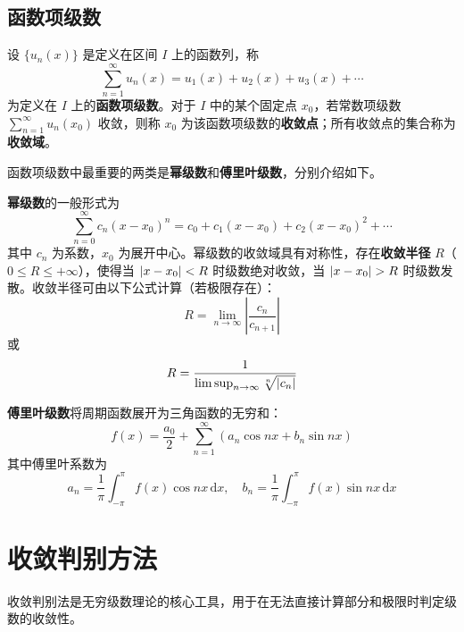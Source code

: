 \subsection{函数项级数}

\begin{definition}
设 $\{u_n(x)\}$ 是定义在区间 $I$ 上的函数列，称
\begin{equation}
\sum_{n=1}^{\infty} u_n(x) = u_1(x) + u_2(x) + u_3(x) + \cdots
\end{equation}
为定义在 $I$ 上的\textbf{函数项级数}。对于 $I$ 中的某个固定点 $x_0$，若常数项级数 $\displaystyle \sum_{n=1}^{\infty} u_n(x_0)$ 收敛，则称 $x_0$ 为该函数项级数的\textbf{收敛点}；所有收敛点的集合称为\textbf{收敛域}。
\end{definition}

函数项级数中最重要的两类是\textbf{幂级数}和\textbf{傅里叶级数}，分别介绍如下。

\textbf{幂级数}的一般形式为
\begin{equation}
\sum_{n=0}^{\infty} c_n (x - x_0)^n = c_0 + c_1(x - x_0) + c_2(x - x_0)^2 + \cdots
\end{equation}
其中 $c_n$ 为系数，$x_0$ 为展开中心。幂级数的收敛域具有对称性，存在\textbf{收敛半径} $R$（$0 \leq R \leq +\infty$），使得当 $\left|x - x_0\right| < R$ 时级数绝对收敛，当 $\left|x - x_0\right| > R$ 时级数发散。收敛半径可由以下公式计算（若极限存在）：
\begin{equation}
R = \lim_{n \to \infty} \left| \frac{c_n}{c_{n+1}} \right|
\end{equation}
或
\begin{equation}
R = \frac{1}{\limsup_{n \to \infty} \sqrt[n]{\left|c_n\right|}}
\end{equation}

\textbf{傅里叶级数}将周期函数展开为三角函数的无穷和：
\begin{equation}
f(x) = \frac{a_0}{2} + \sum_{n=1}^{\infty} \left( a_n \cos nx + b_n \sin nx \right)
\end{equation}
其中傅里叶系数为
\begin{equation}
a_n = \frac{1}{\pi} \int_{-\pi}^{\pi} f(x) \cos nx \, \mathrm{d}x, \quad b_n = \frac{1}{\pi} \int_{-\pi}^{\pi} f(x) \sin nx \, \mathrm{d}x
\end{equation}

\section{收敛判别方法}

收敛判别法是无穷级数理论的核心工具，用于在无法直接计算部分和极限时判定级数的收敛性。

